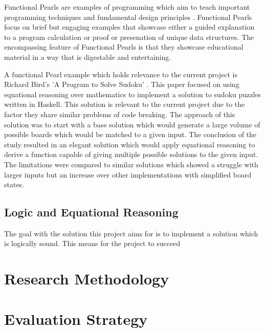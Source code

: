 \documentclass[12pt]{article}  %
\theoremstyle{definition}
\theoremstyle{remark}
\begin{document}
Functional Pearls are examples of programming which aim to teach important programming techniques and fundamental design principles \cite{Pearls}. Functional Pearls focus on brief but engaging examples that showcase either a guided explanation to a program calculation or proof or presenation of unique data structures. The encompassing feature of Functional Pearls is that they showcase educational material in a way that is digestable and entertaining.

A functional Pearl example which holds relevance to the current project is Richard Bird's 'A Program to Solve Sudoku' \cite{Sudoku}. This paper focused on using equational reasoning over mathematics to implement a solution to sudoku puzzles written in Haskell. This solution is relevant to the current project due to the factor they share similar problems of code breaking. The approach of this solution was to start with a base solution which would generate a large volume of possible boards which would be matched to a given input. The conclusion of the study resulted in an elegant solution which would apply equational reasoning to derive a function capable of giving multiple possible solutions to the given input. The limitations were compared to similar solutions which showed a struggle with larger inputs but an increase over other implementations with simplified board states.


\subsection {Logic and Equational Reasoning}
The goal with the solution this project aims for is to implement a solution which is logically sound. This means for the project to succeed


\newpage                     %
\section{Research Methodology}\label{ss:back}

\newpage                     %
\section{Evaluation Strategy}\label{ss:back}
\end{document}
